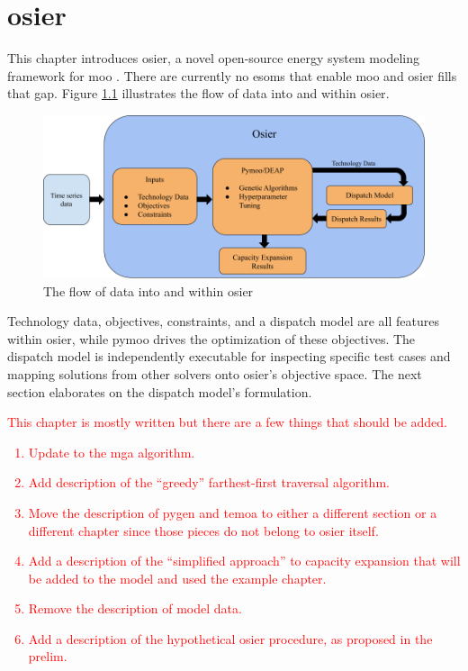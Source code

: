 \chapter{\acf{osier}}
\label{chapter:osier}

This chapter introduces \acf{osier}, a novel open-source energy system modeling
framework for \acl{moo} \cite{dotson_osier_2024}. There are currently no
\acp{esom} that enable \ac{moo} and \ac{osier} fills that gap. Figure 
\ref{fig:osier_flow} illustrates the flow of data into and within \ac{osier}.

\begin{figure}[H]
    \centering
    \includegraphics[width=\columnwidth]{figures/osier_flow}
    \caption{The flow of data into and within \ac{osier}}
    \label{fig:osier_flow}
\end{figure}

Technology data, objectives, constraints, and a dispatch model are all features
within \ac{osier}, while \ac{pymoo} drives the optimization of these objectives.
The dispatch model is independently executable for inspecting specific test
cases and mapping solutions from other solvers onto \ac{osier}'s objective
space. The next section elaborates on the dispatch model's formulation.

\textcolor{red}{This chapter is mostly written but there are a few things that
should be added.}

\textcolor{red}{\begin{enumerate}
    \item Update to the \ac{mga} algorithm.
    \item Add description of the ``greedy'' farthest-first traversal algorithm.
    \item Move the description of \ac{pygen} and \ac{temoa} to either a
    different section or a different chapter since those pieces do not belong to
    \ac{osier} itself.
    \item Add a description of the ``simplified approach'' to capacity expansion
    that will be added to the model and used the example chapter.
    \item Remove the description of model data.
    \item Add a description of the hypothetical \ac{osier} procedure, as
    proposed in the prelim.
\end{enumerate}}









